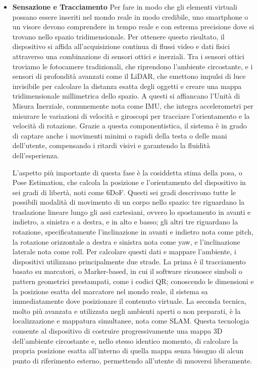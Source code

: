 \begin{itemize}
    \item \textbf{Sensazione e Tracciamento} \newline
    Per fare in modo che gli elementi virtuali possano essere inseriti nel mondo reale in modo credibile, uno smartphone o un visore devono comprendere in tempo reale e con estrema precisione dove si trovano nello spazio tridimensionale. Per ottenere questo risultato, il dispositivo si affida all'acquisizione continua di flussi video e dati fisici attraverso una combinazione di sensori ottici e inerziali. Tra i sensori ottici troviamo le fotocamere tradizionali, che riprendono l'ambiente circostante, e i sensori di profondità avanzati come il LiDAR, che emettono impulsi di luce invisibile per calcolare la distanza esatta degli oggetti e creare una mappa tridimensionale millimetrica dello spazio. A questi si affiancano l'Unità di Misura Inerziale, comunemente nota come IMU, che integra accelerometri per misurare le variazioni di velocità e giroscopi per tracciare l'orientamento e la velocità di rotazione. Grazie a questa componentistica, il sistema è in grado di captare anche i movimenti minimi o rapidi della testa o delle mani dell'utente, compensando i ritardi visivi e garantendo la fluidità dell'esperienza. \newline

    L'aspetto più importante di questa fase è la cosiddetta stima della posa, o Pose Estimation, che calcola la posizione e l'orientamento del dispositivo in sei gradi di libertà, noti come 6DoF. Questi sei gradi descrivono tutte le possibili modalità di movimento di un corpo nello spazio: tre riguardano la traslazione lineare lungo gli assi cartesiani, ovvero lo spostamento in avanti e indietro, a sinistra e a destra, e in alto e basso; gli altri tre riguardano la rotazione, specificatamente l'inclinazione in avanti e indietro nota come pitch, la rotazione orizzontale a destra e sinistra nota come yaw, e l'inclinazione laterale nota come roll. Per calcolare questi dati e mappare l'ambiente, i dispositivi utilizzano principalmente due strade. La prima è il tracciamento basato su marcatori, o Marker-based, in cui il software riconosce simboli o pattern geometrici prestampati, come i codici QR; conoscendo le dimensioni e la posizione esatta del marcatore nel mondo reale, il sistema sa immediatamente dove posizionare il contenuto virtuale. La seconda tecnica, molto più avanzata e utilizzata negli ambienti aperti o non preparati, è la localizzazione e mappatura simultanee, nota come SLAM. Questa tecnologia consente al dispositivo di costruire progressivamente una mappa 3D dell'ambiente circostante e, nello stesso identico momento, di calcolare la propria posizione esatta all'interno di quella mappa senza bisogno di alcun punto di riferimento esterno, permettendo all'utente di muoversi liberamente.


\end{itemize}

